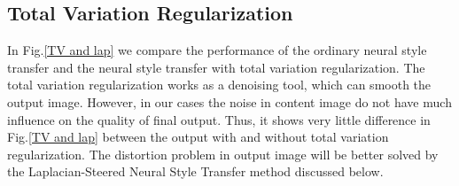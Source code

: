 \documentclass[runningheads]{llncs}
\begin{document}
\subsection{Total Variation Regularization}
In Fig.\ref{TV and lap} we compare the performance of the ordinary neural style transfer and the neural style transfer with total variation regularization. The total variation regularization works as a denoising tool, which can smooth the output image. However, in our cases the noise in content image do not have much influence on the quality of final output. Thus, it shows very little difference in Fig.\ref{TV and lap} between the output with and without total variation regularization. The distortion problem in output image will be better solved by the Laplacian-Steered Neural Style Transfer method discussed below.
\begin{figure}[h!]
\centering
{}
\end{figure}
\end{document}
